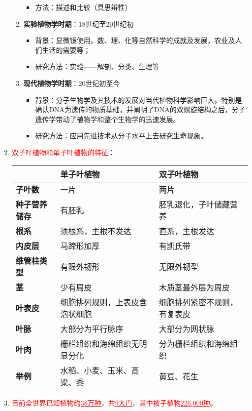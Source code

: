 \begin{enumerate}
\begin{enumerate}
\begin{itemize}
            \item 方法：描述和比较（具思辩性）
        \end{itemize}
        \item \textbf{实验植物学时期}：18世纪至20世纪初
        \begin{itemize}
            \item 背景：显微镜使用，数、理、化等自然科学的成就及发展，农业及人们生活的需要等；
            \item 研究方法：实验——解剖、分类、生理等
        \end{itemize}
        \item \textbf{现代植物学时期}：20世纪初至今
        \begin{itemize}
            \item 背景：分子生物学及其技术的发展对当代植物科学影响巨大。特别是确认DNA为遗传的物质基础，并阐明了DNA的双螺旋结构之后，分子遗传学带动了植物学和整个生物学的迅速发展。
            \item 研究方法：应用先进技术从分子水平上去研究生命现象。
        \end{itemize}
    \end{enumerate}
    \item \textcolor{red}{双子叶植物和单子叶植物的特征}：
    \begin{table}[h]
        \begin{tabular}{C{2cm}C{4cm}C{4cm}}
            \toprule
            &\textbf{单子叶植物}&\textbf{双子叶植物}\\
            \midrule
            \textbf{子叶数}&一片&两片\\
            \textbf{种子营养储存}&有胚乳&胚乳退化，子叶储藏营养\\
            \textbf{根系}&须根系，主根不发达&直系，主根发达\\
            \textbf{内皮层}&马蹄形加厚&有凯氏带\\
            \textbf{维管柱类型}&有限外韧形&无限外韧型\\
            \textbf{茎}&少有周皮&木质茎最外层为周皮\\
            \textbf{叶表皮}&细胞排列规则，上表皮含泡状细胞&细胞排列紧密不规则，有复表皮\\
            \textbf{叶脉}&大部分为平行脉序&大部分为网状脉\\
            \textbf{叶肉}&栅栏组织和海绵组织无明显分化&分为栅栏组织和海绵组织\\
            \textbf{举例}&水稻、小麦、玉米、高粱、黍&黄豆、花生\\
            \bottomrule
        \end{tabular}
    \end{table}
    \item \textcolor{red}{目前全世界已知植物约\uline{38万种}，共\uline{9大门}，其中被子植物\uline{226,000种}。}
\end{enumerate}

